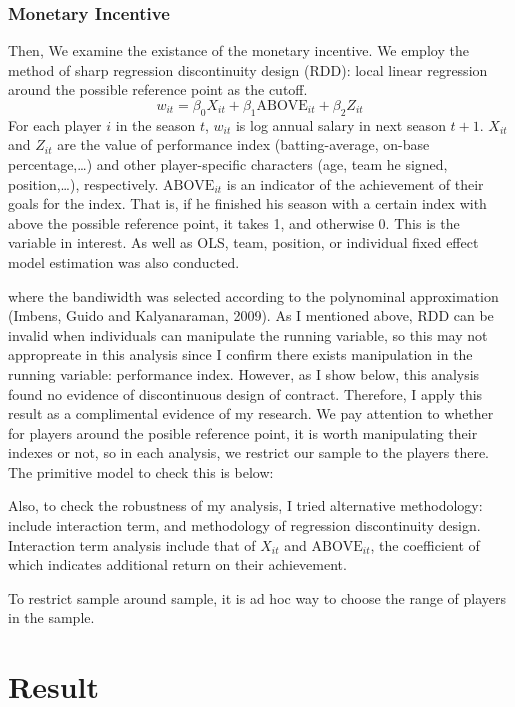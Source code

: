\documentclass[dvipdfmx, 12pt]{article}
\begin{document}
  \subsubsection{Monetary Incentive}

  Then, We examine the existance of the monetary incentive. We employ the method of sharp regression discontinuity design (RDD): local linear regression around the possible reference point as the cutoff.
  \[
  w_{it} = \beta_0 X_{it} + \beta_1 \text{ABOVE}_{it}
  + \beta_2 Z_{it}
  \]
  For each player $i$ in the season $t$, $w_{it}$ is log annual salary in next season $t+1$. $X_{it}$ and $Z_{it}$ are the value of performance index (batting-average, on-base percentage,\ldots) and other player-specific characters (age, team he signed, position,\ldots), respectively. $\text{ABOVE}_{it}$ is an indicator of the achievement of their goals for the index. That is, if he finished his season with a certain index with above the possible reference point, it takes 1, and otherwise 0. This is the variable in interest. As well as OLS, team, position, or individual fixed effect model estimation was also conducted.

  where the bandiwidth was selected according to the polynominal approximation (Imbens, Guido and Kalyanaraman, 2009). As I mentioned above, RDD can be invalid when individuals can manipulate the running variable, so this may not appropreate in this analysis since I confirm there exists manipulation in the running variable: performance index. However, as I show below, this analysis found no evidence of discontinuous design of contract. Therefore, I apply this result as a complimental evidence of my research.
  We pay attention to whether for players around the posible reference point, it is worth manipulating their indexes or not, so in each analysis, we restrict our sample to the players there. The primitive model to check this is below:



  Also, to check the robustness of my analysis, I tried alternative methodology: include interaction term, and methodology of regression discontinuity design. Interaction term analysis include that of $X_{it}$ and $\text{ABOVE}_{it}$, the coefficient of which indicates additional return on their achievement.

  To restrict sample around sample, it is ad hoc way to choose the range of players in the sample.

\section{Result}
\end{document}
